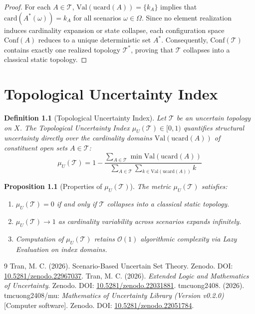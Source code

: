 \documentclass[a4paper,14pt, twoside]{memoir}
\newtheorem{definition}{Definition}[chapter]
\newtheorem{proposition}{Proposition}[chapter]
\begin{document}
	\begin{proof}
		For each $A \in \mathcal{T}$, $\mathrm{Val}(\mathrm{ucard}(A)) = \{k_A\}$ implies that $\mathrm{card}(A^*(\omega)) = k_A$ for all scenarios $\omega \in \Omega$. Since no element realization induces cardinality expansion or state collapse, each configuration space $\mathrm{Conf}(A)$ reduces to a unique deterministic set $A^*$. Consequently, $\mathrm{Conf}(\mathcal{T})$ contains exactly one realized topology $\mathcal{T}^*$, proving that $\mathcal{T}$ collapses into a classical static topology.
	\end{proof}
	
	\chapter{Topological Uncertainty Index}
	
	\begin{definition}[Topological Uncertainty Index]
		Let $\mathcal{T}$ be an uncertain topology on $X$. The \emph{Topological Uncertainty Index} $\mu_U(\mathcal{T}) \in [0, 1)$ quantifies structural uncertainty directly over the cardinality domains $\mathrm{Val}(\mathrm{ucard}(A))$ of constituent open sets $A \in \mathcal{T}$:
		\[
		\mu_U(\mathcal{T}) = 1 - \frac{\sum_{A \in \mathcal{T}} \min \mathrm{Val}(\mathrm{ucard}(A))}{\sum_{A \in \mathcal{T}} \sum_{k \in \mathrm{Val}(\mathrm{ucard}(A))} k}
		\]
	\end{definition}
	
	\begin{proposition}[Properties of $\mu_U(\mathcal{T})$]
		The metric $\mu_U(\mathcal{T})$ satisfies:
		\begin{enumerate}[label=\alph*)]
			\item $\mu_U(\mathcal{T}) = 0$ if and only if $\mathcal{T}$ collapses into a classical static topology.
			\item $\mu_U(\mathcal{T}) \to 1$ as cardinality variability across scenarios expands infinitely.
			\item Computation of $\mu_U(\mathcal{T})$ retains $\mathcal{O}(1)$ algorithmic complexity via Lazy Evaluation on index domains.
		\end{enumerate}
	\end{proposition}
	
	\begin{thebibliography}{9}
		Tran, M. C. (2026). Scenario-Based Uncertain Set Theory. Zenodo. DOI: \href{https://doi.org/10.5281/zenodo.22967037}{10.5281/zenodo.22967037}.
		Tran, M. C. (2026). \textit{Extended Logic and Mathematics of Uncertainty}. Zenodo. DOI: \href{https://doi.org/10.5281/zenodo.22031881}{10.5281/zenodo.22031881}.
		tmcuong2408. (2026). tmcuong2408/mu: \textit{Mathematics of Uncertainty Library (Version v0.2.0)} [Computer software]. Zenodo.
		DOI: \href{https://doi.org/10.5281/zenodo.22051784}{10.5281/zenodo.22051784}.
	\end{thebibliography}
	
\end{document}
